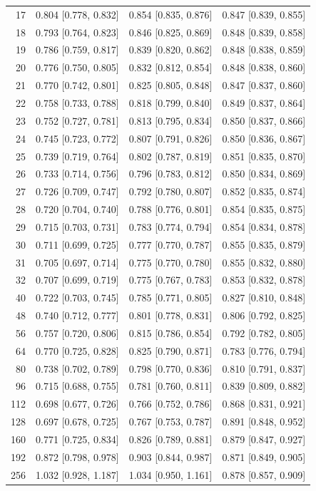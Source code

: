 \begin{longtable}{rccc}
17 & 0.804 [0.778, 0.832] & 0.854 [0.835, 0.876] & 0.847 [0.839, 0.855] \\
18 & 0.793 [0.764, 0.823] & 0.846 [0.825, 0.869] & 0.848 [0.839, 0.858] \\
19 & 0.786 [0.759, 0.817] & 0.839 [0.820, 0.862] & 0.848 [0.838, 0.859] \\
20 & 0.776 [0.750, 0.805] & 0.832 [0.812, 0.854] & 0.848 [0.838, 0.860] \\
21 & 0.770 [0.742, 0.801] & 0.825 [0.805, 0.848] & 0.847 [0.837, 0.860] \\
22 & 0.758 [0.733, 0.788] & 0.818 [0.799, 0.840] & 0.849 [0.837, 0.864] \\
23 & 0.752 [0.727, 0.781] & 0.813 [0.795, 0.834] & 0.850 [0.837, 0.866] \\
24 & 0.745 [0.723, 0.772] & 0.807 [0.791, 0.826] & 0.850 [0.836, 0.867] \\
25 & 0.739 [0.719, 0.764] & 0.802 [0.787, 0.819] & 0.851 [0.835, 0.870] \\
26 & 0.733 [0.714, 0.756] & 0.796 [0.783, 0.812] & 0.850 [0.834, 0.869] \\
27 & 0.726 [0.709, 0.747] & 0.792 [0.780, 0.807] & 0.852 [0.835, 0.874] \\
28 & 0.720 [0.704, 0.740] & 0.788 [0.776, 0.801] & 0.854 [0.835, 0.875] \\
29 & 0.715 [0.703, 0.731] & 0.783 [0.774, 0.794] & 0.854 [0.834, 0.878] \\
30 & 0.711 [0.699, 0.725] & 0.777 [0.770, 0.787] & 0.855 [0.835, 0.879] \\
31 & 0.705 [0.697, 0.714] & 0.775 [0.770, 0.780] & 0.855 [0.832, 0.880] \\
32 & 0.707 [0.699, 0.719] & 0.775 [0.767, 0.783] & 0.853 [0.832, 0.878] \\
40 & 0.722 [0.703, 0.745] & 0.785 [0.771, 0.805] & 0.827 [0.810, 0.848] \\
48 & 0.740 [0.712, 0.777] & 0.801 [0.778, 0.831] & 0.806 [0.792, 0.825] \\
56 & 0.757 [0.720, 0.806] & 0.815 [0.786, 0.854] & 0.792 [0.782, 0.805] \\
64 & 0.770 [0.725, 0.828] & 0.825 [0.790, 0.871] & 0.783 [0.776, 0.794] \\
80 & 0.738 [0.702, 0.789] & 0.798 [0.770, 0.836] & 0.810 [0.791, 0.837] \\
96 & 0.715 [0.688, 0.755] & 0.781 [0.760, 0.811] & 0.839 [0.809, 0.882] \\
112 & 0.698 [0.677, 0.726] & 0.766 [0.752, 0.786] & 0.868 [0.831, 0.921] \\
128 & 0.697 [0.678, 0.725] & 0.767 [0.753, 0.787] & 0.891 [0.848, 0.952] \\
160 & 0.771 [0.725, 0.834] & 0.826 [0.789, 0.881] & 0.879 [0.847, 0.927] \\
192 & 0.872 [0.798, 0.978] & 0.903 [0.844, 0.987] & 0.871 [0.849, 0.905] \\
256 & 1.032 [0.928, 1.187] & 1.034 [0.950, 1.161] & 0.878 [0.857, 0.909] \\
\end{longtable}
